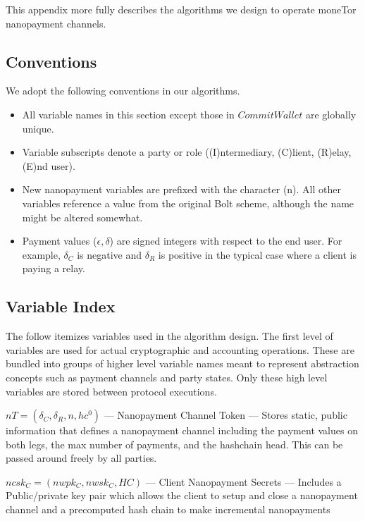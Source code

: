 \label{chap:algorithms}

This appendix more fully describes the algorithms we design to operate moneTor nanopayment
channels.

\subsection{Conventions}

We adopt the following conventions in our algorithms.

\begin{itemize}
\item All variable names in this section except those in $Commit Wallet$ are
  globally unique.
\item Variable subscripts denote a party or role ((I)ntermediary,
  (C)lient, (R)elay, (E)nd user).
\item New nanopayment variables are prefixed with the character
  (n). All other variables reference a value from the original Bolt
  scheme, although the name might be altered somewhat.
\item Payment values ($\epsilon, \delta$) are signed integers with
  respect to the end user. For example, $\delta_C$ is negative and
  $\delta_R$ is positive in the typical case where a client is paying
  a relay.
\end{itemize}

\subsection{Variable Index}

The follow itemizes variables used in the algorithm design. The first level of
variables are used for actual cryptographic and accounting operations. These are
bundled into groups of higher level variable names meant to represent
abstraction concepts such as payment channels and party states. Only these high
level variables are stored between protocol executions.

$nT = (\delta_C, \delta_R, n, hc^0)$ --- Nanopayment Channel Token ---
Stores static, public information that defines a nanopayment channel including
the payment values on both legs, the max number of payments, and the hashchain
head. This can be passed around freely by all parties.

$ncsk_C = (nwpk_C, nwsk_C, HC)$ --- Client Nanopayment Secrets --- Includes
a Public/private key pair which allows the client to setup and close a
nanopayment channel and a precomputed hash chain to make incremental
nanopayments

